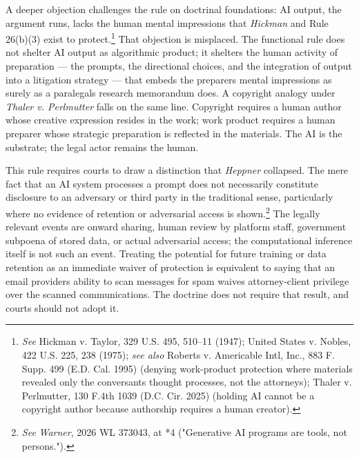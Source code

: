 \documentclass[
  12pt,
]{article}
\begin{document}
A deeper objection challenges the rule on doctrinal foundations: AI
output, the argument runs, lacks the human mental impressions that
\emph{Hickman} and Rule 26(b)(3) exist to protect.\footnote{\emph{See}
  Hickman v. Taylor, 329 U.S. 495, 510--11 (1947); United States v.
  Nobles, 422 U.S. 225, 238 (1975); \emph{see also} Roberts v.
  Americable Int\textquotesingle l, Inc., 883 F. Supp. 499 (E.D. Cal.
  1995) (denying work-product protection where materials revealed only
  the conversants\textquotesingle{} thought processes, not the
  attorney\textquotesingle s); Thaler v. Perlmutter, 130 F.4th 1039
  (D.C. Cir. 2025) (holding AI cannot be a copyright author because
  authorship requires a human creator).} That objection is misplaced.
The functional rule does not shelter AI output as algorithmic product;
it shelters the human activity of preparation --- the prompts, the
directional choices, and the integration of output into a litigation
strategy --- that embeds the preparer\textquotesingle s mental
impressions as surely as a paralegal\textquotesingle s research
memorandum does. A copyright analogy under \emph{Thaler v. Perlmutter}
falls on the same line. Copyright requires a human author whose creative
expression resides in the work; work product requires a human preparer
whose strategic preparation is reflected in the materials. The AI is the
substrate; the legal actor remains the human.

This rule requires courts to draw a distinction that \emph{Heppner}
collapsed. The mere fact that an AI system processes a prompt does not
necessarily constitute disclosure to an adversary or third party in the
traditional sense, particularly where no evidence of retention or
adversarial access is shown.\footnote{\emph{See} \emph{Warner}, 2026 WL
  373043, at *4 ("Generative AI programs are tools, not persons.").} The
legally relevant events are onward sharing, human review by platform
staff, government subpoena of stored data, or actual adversarial access;
the computational inference itself is not such an event. Treating the
potential for future training or data retention as an immediate waiver
of protection is equivalent to saying that an email
provider\textquotesingle s ability to scan messages for spam waives
attorney-client privilege over the scanned communications. The doctrine
does not require that result, and courts should not adopt it.
\end{document}

